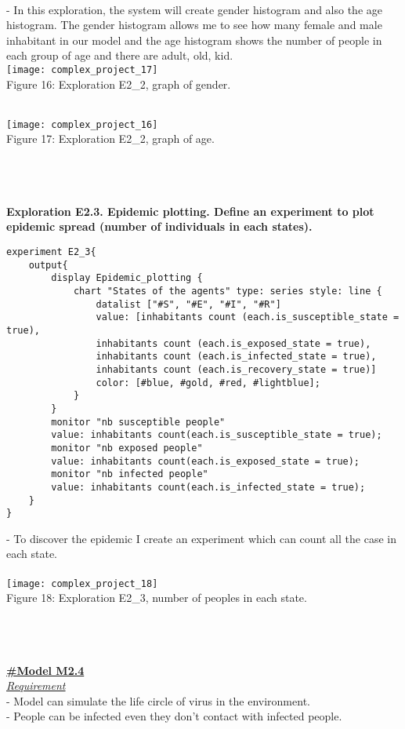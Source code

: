 \documentclass{article}
\begin{document}
\\- In this exploration, the system will create gender histogram and also the age histogram. The gender histogram allows me to see how many female and male inhabitant in our model and the age histogram shows the number of people in each group of age and there are adult, old, kid.
\\
\texttt{[image: complex\_project\_17]}
\\
\caption{Figure 16: Exploration E2\_2, graph of gender.} 
\\
\texttt{[image: complex\_project\_16]}
\\
\caption{Figure 17: Exploration E2\_2, graph of age.} 
\\\\\\
\textbf{Exploration E2.3. Epidemic plotting. Define an experiment to plot epidemic spread (number of individuals in each states).}
\begin{lstlisting}
experiment E2_3{
	output{
		display Epidemic_plotting {
			chart "States of the agents" type: series style: line {
				datalist ["#S", "#E", "#I", "#R"] 
				value: [inhabitants count (each.is_susceptible_state = true), 
				inhabitants count (each.is_exposed_state = true), 
				inhabitants count (each.is_infected_state = true), 
				inhabitants count (each.is_recovery_state = true)] 
				color: [#blue, #gold, #red, #lightblue];
			}
		}
		monitor "nb susceptible people" 
		value: inhabitants count(each.is_susceptible_state = true);
		monitor "nb exposed people" 
		value: inhabitants count(each.is_exposed_state = true);
		monitor "nb infected people" 
		value: inhabitants count(each.is_infected_state = true);
	}
}
\end{lstlisting}
\pagebreak
- To discover the epidemic I create an experiment which can count all the case in each state.
\\\\
\texttt{[image: complex\_project\_18]}
\\
\caption{Figure 18: Exploration E2\_3, number of peoples in each state.} 
\\\\\\
\underline{\textbf{#Model M2.4}}
\\
\underline{\emph{Requirement}}
\\- Model can simulate the life circle of virus in the environment.
\\- People can be infected even they don't contact with infected people.
\end{document}
